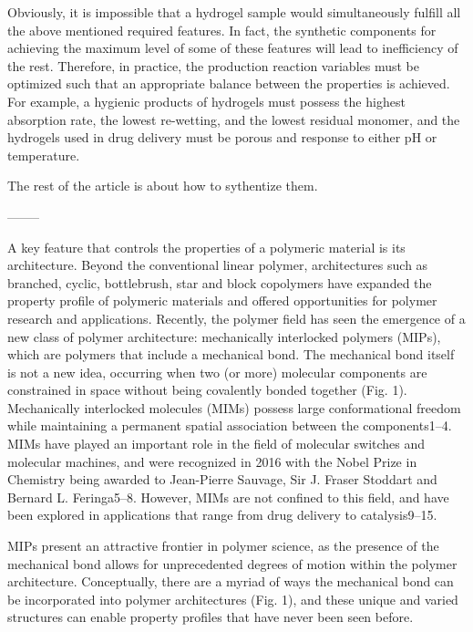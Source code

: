 \documentclass[../../main-notes.tex]{subfiles}
\begin{document}
Obviously, it is impossible that a hydrogel sample would simultaneously fulfill all the above mentioned required features. 
In fact, the synthetic components for achieving the maximum level of some of these features will lead to inefficiency of the rest. 
Therefore, in practice, the production reaction variables must be optimized such that an appropriate balance between the properties is achieved. 
For example, a hygienic products of hydrogels must possess the highest absorption rate, the lowest re-wetting, and the lowest residual monomer, and the hydrogels used in drug delivery must be porous and response to either pH or temperature.


The rest of the article is about how to sythentize them.

--------

\citep{hartMaterialPropertiesApplications2021}

A key feature that controls the properties of a polymeric material is its architecture. 
Beyond the conventional linear polymer, architectures such as branched, cyclic, bottlebrush, star and block copolymers have expanded the property profile of polymeric materials and offered opportunities for polymer research and applications. 
Recently, the polymer field has seen the emergence of a new class of polymer architecture: mechanically interlocked polymers (MIPs), which are polymers that  include a mechanical bond.
The mechanical bond itself is not a new idea, occurring when two (or more) molecular components are constrained in space without being covalently bonded together (Fig. 1). 
Mechanically interlocked molecules (MIMs) possess large conformational freedom while maintaining a permanent spatial association between the components1–4. 
MIMs have played an important role in the field of molecular switches and molecular machines, and were recognized in 2016 with the Nobel Prize in Chemistry being awarded to Jean-Pierre Sauvage, Sir J. Fraser Stoddart and Bernard L. Feringa5–8. 
However, MIMs are not confined to this field, and have been explored in applications that range from drug delivery to catalysis9–15.

MIPs present an attractive frontier in polymer science, as the presence of the mechanical bond allows for unprecedented degrees of motion within the polymer architecture. 
Conceptually, there are a myriad of ways the mechanical bond can be incorporated into polymer architectures (Fig. 1), and these unique and varied structures can enable property profiles that have never been seen before.
\end{document}
